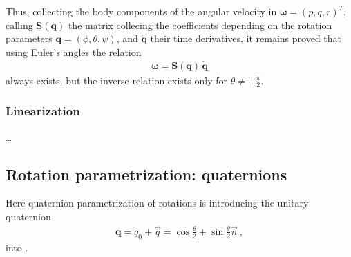 \documentclass[letterpaper,10pt,english]{jupyterBook}
\begin{document}
\sphinxAtStartPar
Thus, collecting the body components of the angular velocity in \(\boldsymbol{\omega} = (p,q,r)^T\), calling \(\mathbf{S}(\mathbf{q})\) the matrix collecing the coefficients depending on the rotation parameters \(\mathbf{q} = (\phi, \theta, \psi)\), and \(\dot{\mathbf{q}}\) their time derivatives, it remains proved that using Euler’s angles the relation
\begin{equation*}
\begin{split}\boldsymbol{\omega} = \mathbf{S}(\mathbf{q}) \, \dot{\mathbf{q}}\end{split}
\end{equation*}
\sphinxAtStartPar
always exists, but the inverse relation exists only for \(\theta \ne \mp \frac{\pi}{2}\).


\subsubsection{Linearization}
\label{\detokenize{ch/kinematics-rotations-param-euler:linearization}}
\sphinxAtStartPar
…

\sphinxstepscope


\subsection{Rotation parametrization: quaternions}
\label{\detokenize{ch/kinematics-rotations-param-quaternions:rotation-parametrization-quaternions}}\label{\detokenize{ch/kinematics-rotations-param-quaternions:classical-mechanics-kinematics-rotations-quaternions}}\label{\detokenize{ch/kinematics-rotations-param-quaternions::doc}}
\sphinxAtStartPar
Here quaternion parametrization of rotations is introducing the unitary quaternion
\begin{equation}\label{equation:ch/kinematics-rotations-param-quaternions:eq:q:rot}
\begin{split}\mathbf{q} = q_0 + \vec{q} = \cos \frac{\theta}{2} + \sin \frac{\theta}{2} \vec{n} \ ,\end{split}
\end{equation}
\sphinxAtStartPar
into {\hyperref[\detokenize{ch/kinematics-rotations-param-axis-angle:classical-mechanics-kinematics-rotations-axis-angle}]{}}.
\end{document}
